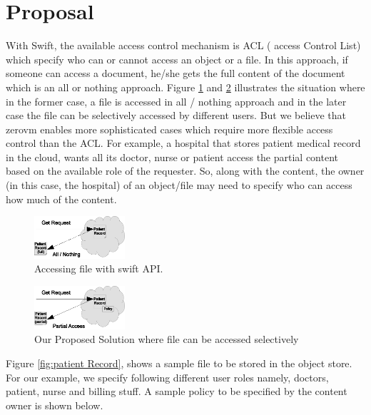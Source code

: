 \section{Proposal}

With Swift, the available access control mechanism is  ACL ( access Control List) which specify who can or cannot access an object or a file. In this approach, if someone can access a document, he/she gets the full content of the document which is an all or nothing approach.  Figure \ref{fig:swiftfile} and \ref{fig:zwiftfile}  illustrates the situation where in the former case, a file is accessed in all / nothing approach and in the later case the file can be selectively accessed by different users. But we believe that   zerovm enables more sophisticated cases which require more flexible access control than the ACL. For example,  a hospital that stores patient medical record in the cloud,  wants all its doctor, nurse or patient access the partial content based on the available role of the requester.  So, along with the content, the owner (in this case, the hospital) of an object/file may need to specify who can access how much of the content.

\begin{figure}[h!] 
  \centering
    \includegraphics[width=0.3\textwidth]{eps/swift_file}
 \caption{Accessing file with swift API.}
\label{fig:swiftfile}
\end{figure}

\begin{figure}[h!]
  \centering
    \includegraphics[width=0.3\textwidth]{eps/zwift_file}
 \caption{Our Proposed Solution where file can be accessed selectively}
\label {fig:zwiftfile} 
\end{figure}




Figure  \ref{fig:patient Record}, shows a sample file to be stored in the object store. For our example, we specify following different user roles namely, doctors, patient, nurse and billing stuff.
A sample policy to be specified by the content owner is shown below.

